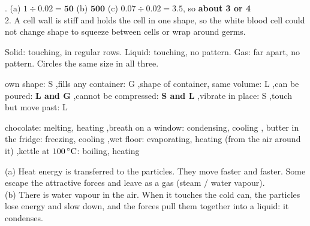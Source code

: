 \documentclass[12pt,a4paper]{article}
\begin{document}
. (a) $1 \div 0.02 = \mathbf{50}$ \quad (b) $\mathbf{500}$ \quad
(c) $0.07 \div 0.02 = 3.5$, so \textbf{about 3 or 4} \\
2. A cell wall is stiff and holds the cell in one shape, so the white blood cell could
not change shape to squeeze between cells or wrap around germs.

\smallskip
{}

\noindent Solid: touching, in regular rows. Liquid: touching, no pattern. Gas: far
apart, no pattern. Circles the same size in all three.

\noindent own shape: S \sep fills any container: G \sep shape of container, same volume:
L \sep can be poured: \textbf{L and G} \sep cannot be compressed: \textbf{S and L}
\sep vibrate in place: S \sep touch but move past: L

\smallskip
{}

\noindent chocolate: melting, heating \sep breath on a window: condensing, cooling \sep
butter in the fridge: freezing, cooling \sep wet floor: evaporating, heating (from the
air around it) \sep kettle at $100\,^{\circ}\mathrm{C}$: boiling, heating

\smallskip
{}

\noindent (a) Heat energy is transferred to the particles. They move faster and faster.
Some escape the attractive forces and leave as a gas (steam / water vapour). \\
(b) There is water vapour in the air. When it touches the cold can, the particles lose
energy and slow down, and the forces pull them together into a liquid: it condenses.

\smallskip
{}
\end{document}
